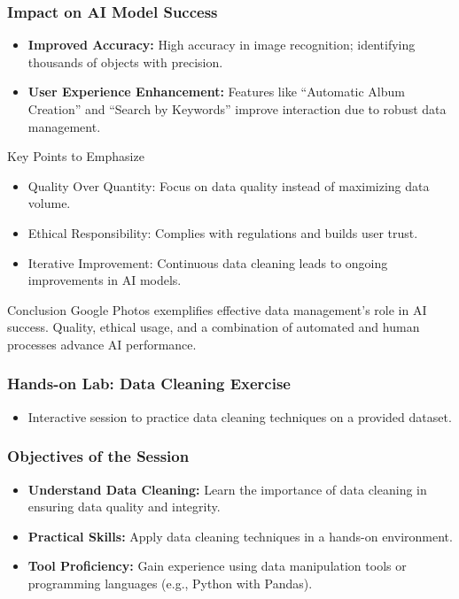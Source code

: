 \documentclass[aspectratio=169]{beamer}
\begin{document}
\begin{frame}[fragile]
    \frametitle{Impact on AI Model Success}
    \begin{itemize}
        \item \textbf{Improved Accuracy:} High accuracy in image recognition; identifying thousands of objects with precision.
        \item \textbf{User Experience Enhancement:} Features like “Automatic Album Creation” and “Search by Keywords” improve interaction due to robust data management.
    \end{itemize}

    \begin{block}{Key Points to Emphasize}
        \begin{itemize}
            \item Quality Over Quantity: Focus on data quality instead of maximizing data volume.
            \item Ethical Responsibility: Complies with regulations and builds user trust.
            \item Iterative Improvement: Continuous data cleaning leads to ongoing improvements in AI models.
        \end{itemize}
    \end{block}

    \begin{block}{Conclusion}
        Google Photos exemplifies effective data management's role in AI success. Quality, ethical usage, and a combination of automated and human processes advance AI performance.
    \end{block}
\end{frame}

\begin{frame}
    \frametitle{Hands-on Lab: Data Cleaning Exercise}
    \begin{itemize}
        \item Interactive session to practice data cleaning techniques on a provided dataset.
    \end{itemize}
\end{frame}

\begin{frame}
    \frametitle{Objectives of the Session}
    \begin{itemize}
        \item \textbf{Understand Data Cleaning:} 
            Learn the importance of data cleaning in ensuring data quality and integrity.
        \item \textbf{Practical Skills:} 
            Apply data cleaning techniques in a hands-on environment.
        \item \textbf{Tool Proficiency:} 
            Gain experience using data manipulation tools or programming languages (e.g., Python with Pandas).
    \end{itemize}
\end{frame}
\end{document}
